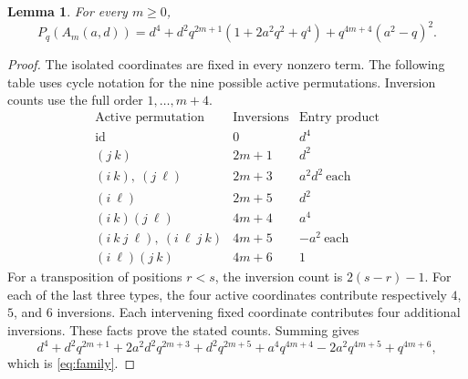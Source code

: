 \documentclass[11pt]{article}
\newtheorem{lemma}[theorem]{Lemma}
\begin{document}
\begin{lemma}\label{lem:family}
For every $m\ge0$,
\begin{equation}\label{eq:family}
 P_q(A_m(a,d))
 =d^4+d^2q^{2m+1}(1+2a^2q^2+q^4)
   +q^{4m+4}(a^2-q)^2.
\end{equation}
\end{lemma}
\begin{proof}
The isolated coordinates are fixed in every nonzero term. The following table uses cycle notation for the nine possible active permutations. Inversion counts use the full order $1,\ldots,m+4$.
\[
\begin{array}{c|c|c}
\text{Active permutation}&\text{Inversions}&\text{Entry product}\\\hline
\mathrm{id}&0&d^4\\
(j\ k)&2m+1&d^2\\
(i\ k),\ (j\ \ell)&2m+3&a^2d^2\ \text{each}\\
(i\ \ell)&2m+5&d^2\\
(i\ k)(j\ \ell)&4m+4&a^4\\
(i\ k\ j\ \ell),\ (i\ \ell\ j\ k)&4m+5&-a^2\ \text{each}\\
(i\ \ell)(j\ k)&4m+6&1
\end{array}
\]
For a transposition of positions $r<s$, the inversion count is $2(s-r)-1$. For each of the last three types, the four active coordinates contribute respectively $4$, $5$, and $6$ inversions. Each intervening fixed coordinate contributes four additional inversions. These facts prove the stated counts. Summing gives
\[
 d^4+d^2q^{2m+1}+2a^2d^2q^{2m+3}+d^2q^{2m+5}
 +a^4q^{4m+4}-2a^2q^{4m+5}+q^{4m+6},
\]
which is \eqref{eq:family}.
\end{proof}
\end{document}
